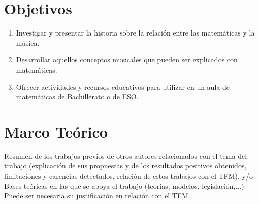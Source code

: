 \documentclass[a4paper, openright, 11pt, titlepage]{report}
\theoremstyle{definition}\newtheorem{defin}[propo]{Definition}
\theoremstyle{definition}\newtheorem{obser}[propo]{Remark}
\theoremstyle{definition}\newtheorem{ejem}[propo]{Ejemplo}
\theoremstyle{definition}\newtheorem{algoritmo}[propo]{Algoritmo}
\begin{document}
\section{Objetivos}
\begin{enumerate}
    \item Investigar y presentar la historia sobre la relación entre las matemáticas y la música.
    \item Desarrollar aquellos conceptos musicales que pueden ser explicados con matemáticas. 
    \item Ofrecer actividades y recursos educativos para utilizar en un aula de matemáticas de Bachillerato o de ESO.
\end{enumerate}
\section{Marco Teórico}
Resumen de los trabajos previos de otros autores relacionados con el tema del trabajo (explicación de sus propuestas y de los resultados positivos obtenidos, limitaciones y carencias detectados, relación de estos trabajos con el TFM), y/o
Bases teóricas en las que se apoya el trabajo (teorías, modelos, legislación,...). Puede ser necesaria su justificación en relación con el TFM.
\newpage
\end{document}
